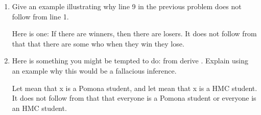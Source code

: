 \begin{enumerate}
\begin{argumentN}[1]






\end{argumentN}




  \item Give an example illustrating why line 9 in the previous problem does not 
   follow from line 1.

\opts{

 \dotline
 \dotline
 \dotline
 \dotline
 \dotline
 \dotline
}
{

	Here is one: If there are winners, then there are losers. It does not follow 
   from that that there are some who when they win they lose.
  }

\item Here is something you might be tempted to do: from  derive    . Explain using an example why this would be a fallacious inference.
\opts{

 \dotline
 \dotline
 \dotline
 \dotline
 \dotline
 \dotline
}
{

 Let  mean that x is a Pomona student, and let  mean that x is a HMC 
 student. It does not follow from that that everyone is a Pomona student or 
 everyone is an HMC student.
}

\end{enumerate}
